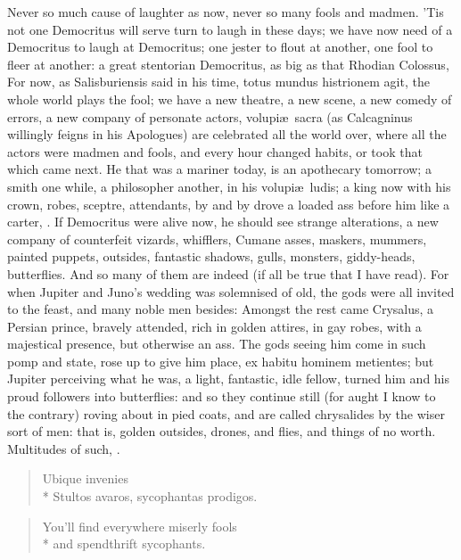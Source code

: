 {Never so much cause of laughter as now, never so many fools and madmen.
'Tis not one Democritus will serve turn to laugh in these days; we
have now need of a Democritus to laugh at Democritus; one jester to
flout at another, one fool to fleer at another: a great stentorian
Democritus, as big as that Rhodian Colossus, For now, as
Salisburiensis said in his time, totus mundus histrionem agit, the
whole world plays the fool; we have a new theatre, a new scene, a new
comedy of errors, a new company of personate actors, volupi\ae{}\ sacra (as
Calcagninus willingly feigns in his Apologues) are celebrated all the
world over, where all the actors were madmen and fools, and every
hour changed habits, or took that which came next. He that was a
mariner today, is an apothecary tomorrow; a smith one while, a
philosopher another, in his volupi\ae{}\ ludis; a king now with his crown,
robes, sceptre, attendants, by and by drove a loaded ass before him
like a carter, \etc{}. If Democritus were alive now, he should see strange
alterations, a new company of counterfeit vizards, whifflers, Cumane
asses, maskers, mummers, painted puppets, outsides, fantastic shadows,
gulls, monsters, giddy-heads, butterflies. And so many of them are
indeed (if all be true that I have read). For when Jupiter and
Juno's wedding was solemnised of old, the gods were all invited to the
feast, and many noble men besides: Amongst the rest came Crysalus, a
Persian prince, bravely attended, rich in golden attires, in gay robes,
with a majestical presence, but otherwise an ass. The gods seeing him
come in such pomp and state, rose up to give him place, ex habitu
hominem metientes; but Jupiter perceiving what he was, a light,
fantastic, idle fellow, turned him and his proud followers into
butterflies: and so they continue still (for aught I know to the
contrary) roving about in pied coats, and are called chrysalides by the
wiser sort of men: that is, golden outsides, drones, and flies, and
things of no worth. Multitudes of such, \etc{}.
\settowidth{\versewidth}{Stultos avaros, sycophantas prodigos.}
\begin{verse}
\hspace{0.5\versewidth}\textlatin{Ubique invenies}\\*
\textlatin{Stultos avaros, sycophantas prodigos.}%
\end{verse}
\begin{verse}
You'll find everywhere miserly fools\\*
and spendthrift sycophants.\\
\end{verse}

}
